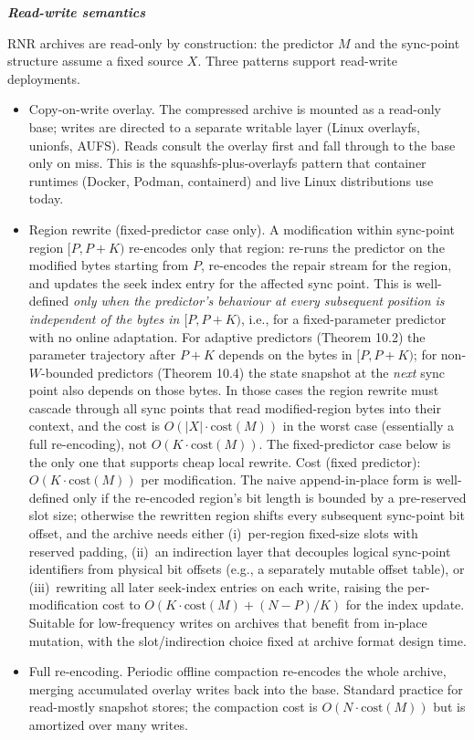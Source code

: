 \documentclass[
]{article}
\begin{document}
\emph{\textbf{Read-write semantics}}

RNR archives are read-only by construction: the predictor $M$ and the
sync-point structure assume a fixed source $X$. Three patterns
support read-write deployments.

\begin{itemize}
\item
  Copy-on-write overlay. The compressed archive is mounted as a
  read-only base; writes are directed to a separate writable layer
  (Linux overlayfs, unionfs, AUFS). Reads consult the overlay first
  and fall through to the base only on miss. This is the
  squashfs-plus-overlayfs pattern that container runtimes (Docker,
  Podman, containerd) and live Linux distributions use today.
\item
  Region rewrite (fixed-predictor case only). A modification within
  sync-point region $[P, P + K)$ re-encodes only that region:
  re-runs the predictor on the modified bytes starting from $P$,
  re-encodes the repair stream for the region, and updates the seek
  index entry for the affected sync point. This is well-defined
  \emph{only when the predictor's behaviour at every subsequent
  position is independent of the bytes in $[P, P+K)$}, i.e., for a
  fixed-parameter predictor with no online adaptation. For adaptive
  predictors (Theorem 10.2) the parameter trajectory after $P + K$
  depends on the bytes in $[P, P+K)$; for non-$W$-bounded
  predictors (Theorem 10.4) the state snapshot at the \emph{next}
  sync point also depends on those bytes. In those cases the
  region rewrite must cascade through all sync points that read
  modified-region bytes into their context, and the cost is
  $O(|X| \cdot \mathrm{cost}(M))$ in the worst case (essentially a
  full re-encoding), not $O(K \cdot \mathrm{cost}(M))$. The
  fixed-predictor case below is the only one that supports cheap
  local rewrite. Cost (fixed predictor): $O(K \cdot \mathrm{cost}(M))$
  per modification.
  The naive append-in-place form is well-defined only if the
  re-encoded region's bit length is bounded by a pre-reserved slot
  size; otherwise the rewritten region shifts every subsequent
  sync-point bit offset, and the archive needs either (i)~per-region
  fixed-size slots with reserved padding, (ii)~an indirection layer
  that decouples logical sync-point identifiers from physical bit
  offsets (e.g., a separately mutable offset table), or
  (iii)~rewriting all later seek-index entries on each write,
  raising the per-modification cost to
  $O(K \cdot \mathrm{cost}(M) + (N-P)/K)$ for the index update.
  Suitable for low-frequency writes on archives that benefit from
  in-place mutation, with the slot/indirection choice fixed at
  archive format design time.
\item
  Full re-encoding. Periodic offline compaction re-encodes the whole
  archive, merging accumulated overlay writes back into the base.
  Standard practice for read-mostly snapshot stores; the compaction
  cost is $O(N \cdot \mathrm{cost}(M))$ but is amortized over many
  writes.
\end{itemize}
\end{document}
